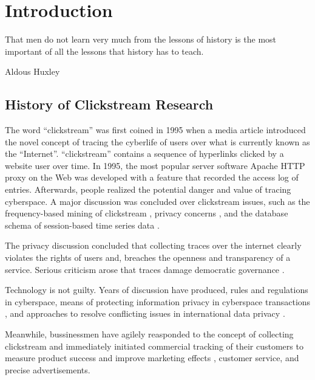 \section{Introduction}
\label{ch:intro}

\epigraph{That men do not learn very much from the lessons of history is the most important of all the lessons that history has to teach.}{Aldous Huxley}

\subsection{History of Clickstream Research}


The word ``clickstream'' \cite{friedman1995} was first coined in 1995 when a media 
article introduced the novel concept of tracing the cyberlife of users over what is currently known
as the ``Internet''. ``clickstream'' contains a sequence of hyperlinks clicked by a 
website user over time. In 1995, the most popular server software 
Apache HTTP \cite{apache1995http} proxy on the Web was developed with a feature that 
recorded the access log of entries. Afterwards, people realized the potential danger and value 
of tracing cyberspace. A major discussion was concluded over clickstream issues, such as 
the frequency-based mining of clickstream \cite{brodwin1995}, privacy concerns
\cite{reidenberg1996governing}, and the database schema of session-based time series data 
\cite{courtheoux2000database}.


The privacy discussion concluded that collecting traces over the internet clearly violates 
the rights of users and,
breaches the openness and transparency of a service.
Serious criticism arose that traces damage democratic governance \cite{gindin1997lost}.

Technology is not guilty. Years of discussion have produced, rules 
\cite{reidenberg1996governing} and regulations \cite{skok1999establishing} in cyberspace,
means of protecting information privacy in cyberspace transactions \cite{kang1997information},
and approaches to resolve conflicting issues in international data privacy \cite{reidenberg1999resolving}.

Meanwhile, bussinessmen have agilely reasponded to the concept of collecting clickstream 
and immediately initiated commercial tracking of their customers to measure product success \cite{schonberg2000measuring}
and improve marketing effects \cite{novick1995}, customer service, and precise advertisements\cite{reagle1999platform, bucklin2000sticky}.

